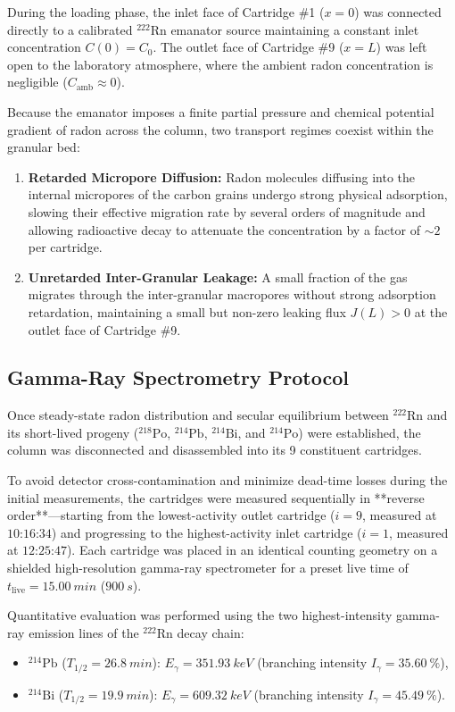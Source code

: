 \documentclass[11pt,a4paper]{article}
\begin{document}
During the loading phase, the inlet face of Cartridge \#1 ($x = 0$) was connected directly to a calibrated $^{222}\text{Rn}$ emanator source maintaining a constant inlet concentration $C(0) = C_0$. The outlet face of Cartridge \#9 ($x = L$) was left open to the laboratory atmosphere, where the ambient radon concentration is negligible ($C_{\text{amb}} \approx 0$). 

Because the emanator imposes a finite partial pressure and chemical potential gradient of radon across the column, two transport regimes coexist within the granular bed:
\begin{enumerate}
    \item \textbf{Retarded Micropore Diffusion:} Radon molecules diffusing into the internal micropores of the carbon grains undergo strong physical adsorption, slowing their effective migration rate by several orders of magnitude and allowing radioactive decay to attenuate the concentration by a factor of $\sim 2$ per cartridge.
    \item \textbf{Unretarded Inter-Granular Leakage:} A small fraction of the gas migrates through the inter-granular macropores without strong adsorption retardation, maintaining a small but non-zero leaking flux $J(L) > 0$ at the outlet face of Cartridge \#9.
\end{enumerate}

\subsection{Gamma-Ray Spectrometry Protocol}
Once steady-state radon distribution and secular equilibrium between $^{222}\text{Rn}$ and its short-lived progeny ($^{218}\text{Po}$, $^{214}\text{Pb}$, $^{214}\text{Bi}$, and $^{214}\text{Po}$) were established, the column was disconnected and disassembled into its 9 constituent cartridges. 

To avoid detector cross-contamination and minimize dead-time losses during the initial measurements, the cartridges were measured sequentially in **reverse order**—starting from the lowest-activity outlet cartridge ($i = 9$, measured at $\text{10:16:34}$) and progressing to the highest-activity inlet cartridge ($i = 1$, measured at $\text{12:25:47}$). Each cartridge was placed in an identical counting geometry on a shielded high-resolution gamma-ray spectrometer for a preset live time of $t_{\text{live}} = \SI{15.00}{min}$ ($\SI{900}{s}$).

Quantitative evaluation was performed using the two highest-intensity gamma-ray emission lines of the $^{222}\text{Rn}$ decay chain:
\begin{itemize}
    \item $^{214}\text{Pb}$ ($T_{1/2} = \SI{26.8}{min}$): $E_\gamma = \SI{351.93}{keV}$ (branching intensity $I_\gamma = \SI{35.60}{\percent}$),
    \item $^{214}\text{Bi}$ ($T_{1/2} = \SI{19.9}{min}$): $E_\gamma = \SI{609.32}{keV}$ (branching intensity $I_\gamma = \SI{45.49}{\percent}$).
\end{itemize}
\end{document}
